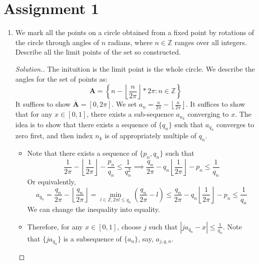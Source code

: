 \section{Assignment 1}
\begin{enumerate}
\item
We mark all the points on a circle obtained from a fixed point by rotations of the circle through angles of $n$ radians, where $n\in\mathbb{Z}$ ranges over all integers. Describe all the limit points of the set so constructed.
\begin{proof}[Solution.]
The inituition is the limit point is the whole circle. We describe the angles for the set of points as:
\[
\bm A=\left\{n-\left\lfloor\frac{n}{2\pi}\right\rfloor*2\pi: n\in\mathbb{Z}\right\}
\]
It suffices to show $\overline{\bm A} = [0,2\pi]$.  We set $a_n =\frac{n}{2\pi} - \left\lfloor\frac{n}{2\pi}\right\rfloor$. It suffices to show that for any $x\in[0,1]$, there exists a sub-sequence $a_{n_k}$ converging to $x$. The idea is to show that there exists a sequence of $\{q_n\}$ such that $a_{q_n}$ converges to zero first, and then index $n_k$ is of appropriately multiple of $q_n$.
\begin{itemize}
\item
Note that there exists a sequence of $\{p_n,q_n\}$ such that
\[
\frac{1}{2\pi} -  \left\lfloor\frac{1}{2\pi}\right\rfloor - \frac{p_n}{q_n}\le\frac{1}{q_n^2}
\implies
\frac{q_n}{2\pi} -  q_n\left\lfloor\frac{1}{2\pi}\right\rfloor - p_n\le\frac{1}{q_n}
\]
Or equivalently,
\[
a_{q_n}=\frac{q_n}{2\pi} - \left\lfloor\frac{q_n}{2\pi}\right\rfloor
=\min_{l\in\mathbb{Z},2\pi l\le q_n}\left(
\frac{q_n}{2\pi} - l\right)
\le
\frac{q_n}{2\pi} -  q_n\left\lfloor\frac{1}{2\pi}\right\rfloor - p_n\le\frac{1}{q_n}
\]
We can change the inequality into equality.
\item
Therefore, for any $x\in[0,1]$, choose $j$ such that $|ja_{q_n} - x|\le\frac{1}{q_n}$. Note that $\{ja_{q_n}\}$ is a subsequence of $\{a_n\}$, say, $a_{j,q,n}$.
\end{itemize}




\end{proof}
\end{enumerate}
